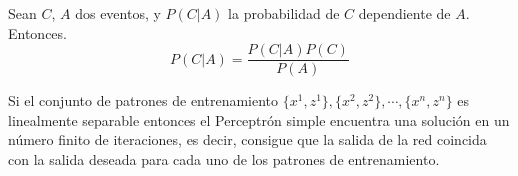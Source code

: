 
\begin{theorem}[Bayes]
    \label{theorem:bayes}
    Sean $C$, $A$ dos eventos, y $P(C|A)$ la probabilidad de $C$ dependiente de $A$. Entonces.
    \[ P(C|A) = \frac{P(C|A) P(C)}{P(A)} \]
\end{theorem}

\begin{theorem}
    \label{theorem:ConvergenciaRosenblatt}
    Si el conjunto de patrones de entrenamiento $ \{x^{1}, z^{1}\}, \{x^{2}, z^{2}\}, \cdots, \{x^{n}, z^{n}\} $ es linealmente separable entonces el Perceptrón simple encuentra una solución en un número finito de iteraciones, es decir, consigue que la salida de la red coincida con la salida deseada para cada uno de los patrones de entrenamiento.
\end{theorem}